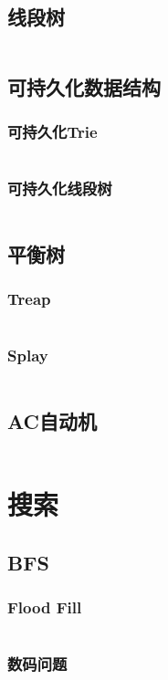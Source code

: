 \documentclass[a4paper,12pt]{article}
\begin{document}
\subsection{线段树}
\inputminted[breaklines, linenos]{c++}{ds/seg_tree.cc}
\subsection{可持久化数据结构}
\subsubsection{可持久化Trie}
\inputminted[breaklines, linenos]{c++}{ds/last_trie.cc}
\subsubsection{可持久化线段树}
\inputminted[breaklines, linenos]{c++}{ds/last_seg.cc}
\subsection{平衡树}
\subsubsection{Treap}
\inputminted[breaklines, linenos]{c++}{ds/treap.cc}
\subsubsection{Splay}
\inputminted[breaklines, linenos]{c++}{ds/splay.cc}
\subsection{AC自动机}
\inputminted[breaklines, linenos]{c++}{ds/ac_auto.cc}


\newpage  
\section{搜索}
\subsection{BFS}
\subsubsection{Flood Fill}
\inputminted[breaklines, linenos]{c++}{search/bfs/flood.cc}
\subsubsection{数码问题}
\inputminted[breaklines, linenos]{c++}{search/bfs/shuma.cc}
\end{document}
